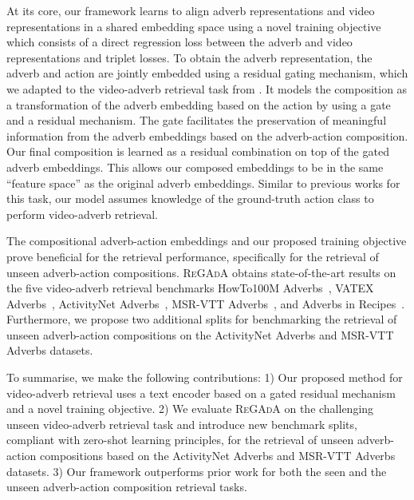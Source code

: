 \documentclass[table]{bmvc2k}
\newcommand{\modelName}{\textsc{ReGAdA}\xspace}
\begin{document}
At its core, our framework learns to align adverb representations and video representations in a shared embedding space using a novel training objective which consists of a direct regression loss between the adverb and video representations and triplet losses.
To obtain the adverb representation, the adverb and action are jointly embedded using a residual gating mechanism, which we adapted to the video-adverb retrieval task from \cite{vo2019composing}.
It models the composition as a transformation of the adverb embedding based on the action by using a gate and a residual mechanism. 
The gate facilitates the preservation of meaningful information from the adverb embeddings based on the adverb-action composition.
Our final composition is learned as a residual combination on top of the gated adverb embeddings. This allows our composed embeddings to be in the same ``feature space'' as the original adverb embeddings. 
Similar to previous works for this task, our model assumes knowledge of the ground-truth action class to perform video-adverb retrieval. 

The compositional adverb-action embeddings and our proposed training objective prove beneficial for the retrieval performance, specifically for the retrieval of unseen adverb-action compositions.
\modelName obtains state-of-the-art results on the five video-adverb retrieval benchmarks HowTo100M Adverbs~\cite{miech2019howto100m,doughty_action_2020}, VATEX Adverbs~\cite{wang2019vatex,doughty_how_2022}, ActivityNet Adverbs~\cite{caba2015activitynet,doughty_how_2022}, MSR-VTT Adverbs~\cite{xu2016msr,doughty_how_2022}, and Adverbs in Recipes~\cite{miech2019howto100m,moltisanti2023learning}. 
Furthermore, we propose two additional splits for benchmarking the retrieval of unseen adverb-action compositions on the ActivityNet Adverbs and MSR-VTT Adverbs datasets.

To summarise, we make the following contributions: 1) Our proposed method for video-adverb retrieval uses a text encoder based on a gated residual mechanism and a novel training objective. 
2) We evaluate \modelName on the challenging unseen video-adverb retrieval task and introduce new benchmark splits, compliant with zero-shot learning principles, for the retrieval of unseen adverb-action compositions based on the ActivityNet Adverbs and MSR-VTT Adverbs datasets. 3) Our framework outperforms prior work for both the seen and the unseen adverb-action composition retrieval tasks.
\end{document}
